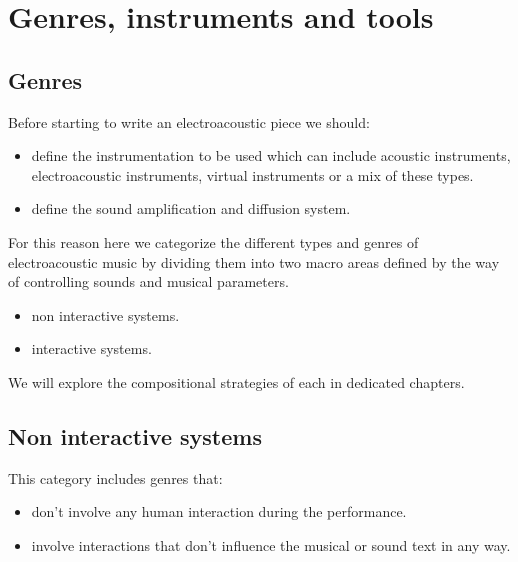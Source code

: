 \chapter{Genres, instruments and tools}

\section{Genres}\label{genres}

Before starting to write an electroacoustic piece we should:

\begin{itemize}
\tightlist
\item define the instrumentation to be used which can include acoustic instruments, electroacoustic instruments, virtual instruments or a mix of these types.
\item define the sound amplification and diffusion system.
\end{itemize}


For this reason here we categorize the different types and genres of electroacoustic music by dividing them into two macro areas defined by the way of controlling sounds and musical parameters.

\begin{itemize}
\tightlist
\item non interactive systems.
\item interactive systems.
\end{itemize}

We will explore the compositional strategies of each in dedicated chapters.

\section{Non interactive systems}\label{non-interactive-systems}

This category includes genres that:

\begin{itemize}
\tightlist
\item don't involve any human interaction during the performance.\\
\item involve interactions that don't influence the musical or sound text in any way.
\end{itemize}

